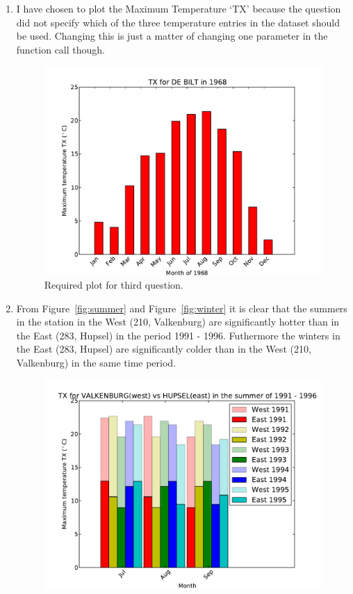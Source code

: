 \documentclass[a4paper]{article}
\begin{document}
\begin{enumerate}
\item
I have chosen to plot the Maximum Temperature `TX' because the question did not specify which of the three temperature entries in the dataset should be used. Changing this is just a matter of changing one parameter in the function call though.
\begin{figure}[h!] 
\begin{center} 
\includegraphics[scale=0.5]{../Week3/BLAC_hw5_TLRH_6126561_260_TX_1968.pdf} 
\caption{Required plot for third question.}
\end{center} 
\end{figure} 
\item
From Figure~\ref{fig:summer} and Figure~\ref{fig:winter} it is clear that the summers in the station in the West (210, Valkenburg) are significantly hotter than in the East (283, Hupsel) in the period 1991 - 1996. Futhermore the winters in the East (283, Hupsel) are significantly colder than in the West (210, Valkenburg) in the same time period.
\begin{figure}[h!] 
\begin{center} 
\includegraphics[scale=0.5]{../Week3/BLAC_hw5_TLRH_6126561_210vs283_TX_summer_1991.pdf} 

\end{center}
\end{figure}
\end{enumerate}
\end{document}
